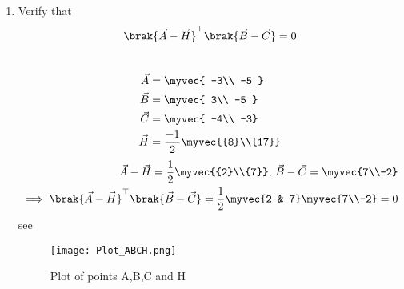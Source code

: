 \documentclass[11pt]{book}
\begin{document}
\begin{enumerate}[label=\thesection.\arabic*.,ref=\thesection.\theenumi]
\item Verify that 
		\begin{align}
			\brak{\vec{A}-\vec{H}}^{\top}\brak{\vec{B}-\vec{C}} = 0
		\end{align}
\\  \solution
 \begin{align} 
 \vec{A} &= \myvec{ -3\\ -5 } \\ \vec{B} &= \myvec{ 3\\ -5 }
  \\\vec{C} &= \myvec{ -4\\ -3} \\ \vec{H} &=\frac{-1}{2}\myvec{{8}\\{17}}
 \end{align}
\begin{align}
\vec{A}-\vec{H}=\frac{1}{2}\myvec{{2}\\{7}},\,
\vec{B}-\vec{C}=\myvec{7\\-2}
\\
	\implies \brak{\vec{A}-\vec{H}}^{\top}\brak{\vec{B}-\vec{C}}=\frac{1}{2}\myvec{2 & 7}
\myvec{7\\-2}
=0
\end{align}
see 
\begin{figure}
    \centering
    \texttt{[image: Plot\_ABCH.png]}
    \caption{Plot of points A,B,C and H}
    \label{fig:Plot_ABCH}
\end{figure}



\end{enumerate}
\end{document}
